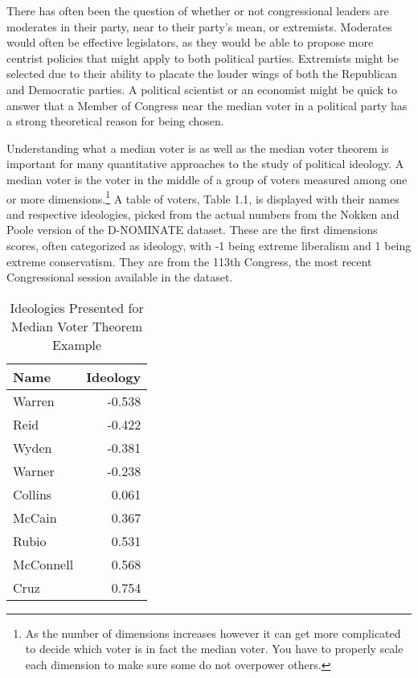 \documentclass[12pt,twoside]{reedthesis}
\begin{document}
  There has often been the question of whether or not congressional
  leaders are moderates in their party, near to their party's mean, or
  extremists. Moderates would often be effective legislators, as they
  would be able to propose more centrist policies that might apply to both
  political parties. Extremists might be selected due to their ability to
  placate the louder wings of both the Republican and Democratic parties.
  A political scientist or an economist might be quick to answer that a
  Member of Congress near the median voter in a political party has a
  strong theoretical reason for being chosen.
  
  Understanding what a median voter is as well as the median voter theorem
  is important for many quantitative approaches to the study of political
  ideology. A median voter is the voter in the middle of a group of voters
  measured among one or more
  dimensions.\footnote{As the number of dimensions increases however it can get more complicated to decide which voter is in fact the median voter. You have to properly scale each dimension to make sure some do not overpower others.}
  A table of voters, Table 1.1, is displayed with their names and
  respective ideologies, picked from the actual numbers from the Nokken
  and Poole version of the D-NOMINATE dataset. These are the first
  dimensions scores, often categorized as ideology, with -1 being extreme
  liberalism and 1 being extreme conservatism. They are from the 113th
  Congress, the most recent Congressional session available in the
  dataset.
  
  \begin{table}[]
  \centering
  \caption{Ideologies Presented for Median Voter Theorem Example}
  \begin{tabular}{l|r}
  Name      & Ideology \\ \hline
  Warren    & -0.538   \\
  Reid      & -0.422   \\
  Wyden     & -0.381   \\
  Warner    & -0.238   \\
  Collins   & 0.061    \\
  McCain    & 0.367    \\
  Rubio     & 0.531    \\
  McConnell & 0.568    \\
  Cruz      & 0.754   
  \end{tabular}
  \end{table}
  
\end{document}
